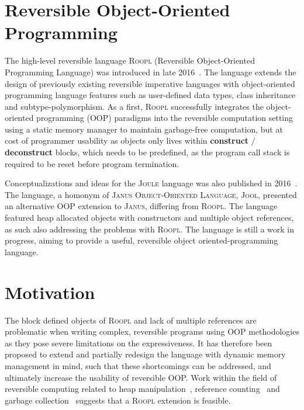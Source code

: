 \section{Reversible Object-Oriented Programming}
\label{sec:reversible-object-oriented-programming}
The high-level reversible language \textsc{Roopl} (Reversible Object-Oriented Programming Language) was introduced in late 2016~\cite{th:roopl, th:roopl2}. The language extends the design of previously existing reversible imperative languages with object-oriented programming language features such as user-defined data types, class inheritance and subtype-polymorphism. As a first, \textsc{Roopl} successfully integrates the object-oriented programming (OOP) paradigms into the reversible computation setting using a static memory manager to maintain garbage-free computation, but at cost of programmer usability as objects only lives within \textbf{construct} / \textbf{deconstruct} blocks, which needs to be predefined, as the program call stack is required to be reset before program termination.

Conceptualizations and ideas for the \textsc{Joule} language was also published in 2016~\cite{us:joule}. The language, a homonym of \textsc{Janus Object-Oriented Language}, \textsc{Jool}, presented an alternative OOP extension to \textsc{Janus}, differing from \textsc{Roopl}. The language featured heap allocated objects with constructors and multiple object references, as such also addressing the problems with \textsc{Roopl}. The language is still a work in progress, aiming to provide a useful, reversible object oriented-programming language.
 

\section{Motivation}
\label{sec:motivation}
The block defined objects of \textsc{Roopl} and lack of multiple references are problematic when writing complex, reversible programs using OOP methodologies as they pose severe limitations on the expressiveness. It has therefore been proposed to extend and partially redesign the language with dynamic memory management in mind, such that these shortcomings can be addressed, and ultimately increase the usability of reversible OOP. Work within the field of reversible computing related to heap manipulation~\cite{ha:heap}, reference counting~\cite{tm:refcounting} and garbage collection~\cite{tm:garbage} suggests that a \textsc{Roopl} extension is feasible.


